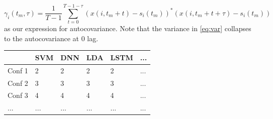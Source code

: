 \begin{equation}
	\gamma_i(t_m, \tau) = \frac{1}{T-1}\sum_{t=0}^{T-1- \tau}(x(i, t_m + t) - s_i(t_m))^*(x(i, t_m + t + \tau) - s_i(t_m))
\end{equation}
as our expression for autocovariance. Note that the variance in \ref{eq:var} collapses to the autocovariance at 0 lag. 

\begin{table}[]
\begin{tabular}{|l|l|l|l|l|l|} \hline
                        &  SVM & DNN & LDA & LSTM & ... \\ \hline
           Conf 1& 2 & 2 & 2 & 2 & ... \\ \hline
           Conf 2& 3 & 3 & 3 & 3 &  ...\\ \hline
           Conf 3& 4 & 4 & 4 & 4 & ... \\ \hline
           ...          & ... & ... & ... & ... & ... \\ \hline
\end{tabular}
\end{table}

